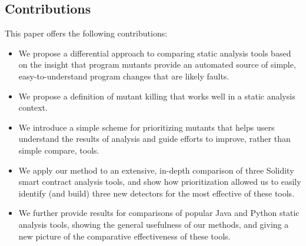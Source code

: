 \subsection{Contributions}

This paper offers the following contributions:

\begin{itemize}
\item We propose a differential approach to comparing static analysis tools based on the insight that program mutants provide an automated source of simple, easy-to-understand program changes that are likely faults.
\item We propose a definition of mutant killing that works well in a static analysis context.
\item We introduce a simple scheme for prioritizing mutants that helps users understand the results of analysis and guide efforts to improve, rather than simple compare, tools.
\item We apply our method to an extensive, in-depth comparison of three Solidity smart contract analysis tools, and show how prioritization allowed us to easily identify (and build) three new detectors for the most effective of these tools.
\item We further provide results for comparisons of popular Java and Python static analysis tools, showing the general usefulness of our methods, and giving a new picture of the comparative effectiveness of these tools.
\end{itemize}